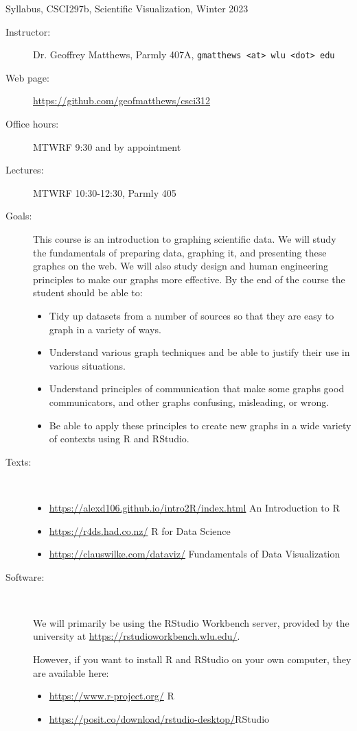 \documentclass[12pt]{article}
\newcommand{\li}{\item}
\newcommand{\myitem}[1]{\item[#1]}
\begin{document}
\begin{center}
{\Large Syllabus, CSCI297b, Scientific Visualization, Winter 2023}
\end{center}

\begin{description}

\myitem{Instructor:}
Dr. Geoffrey Matthews,
Parmly 407A, {\tt gmatthews <at>  wlu <dot> edu}

\myitem{Web page:} \url{https://github.com/geofmatthews/csci312} 

\myitem{Office hours:} MTWRF 9:30 and by appointment

\myitem{Lectures:} MTWRF 10:30-12:30, Parmly 405

\myitem{Goals:} This course is an introduction to graphing scientific data.
We will study the fundamentals of preparing data, graphing it, and 
presenting these graphcs on the web.  We will also study design
and human engineering principles to make our graphs more
effective.  By the end of the course the student should be able to:
\begin{itemize}
\li Tidy up datasets from a number of sources so that they are easy
to graph in a variety of ways.
\li Understand various graph techniques and be able to justify 
their use in various situations.
\li Understand principles of communication that make some graphs
good communicators, and other graphs confusing, misleading, or
wrong.
\li Be able to apply these principles to create new graphs
in a wide variety of contexts using R and RStudio.
\end{itemize}

\myitem{Texts:}~

\begin{itemize}

\li
\url{https://alexd106.github.io/intro2R/index.html}
\dotfill
An Introduction to R

\li
\url{https://r4ds.had.co.nz/}
\dotfill
R for Data Science


\li
\url{https://clauswilke.com/dataviz/}
\dotfill
Fundamentals of Data Visualization
\end{itemize}

\myitem{Software:} ~

We will primarily be using the RStudio Workbench server, provided
by the university at \url{https://rstudioworkbench.wlu.edu/}.

However, if you want to install R and RStudio on your own
computer, they are available here:
\begin{itemize}
\li
\url{https://www.r-project.org/} \dotfill R
\li
\url{https://posit.co/download/rstudio-desktop/}\dotfill RStudio
\end{itemize}



\end{description}
\end{document}
